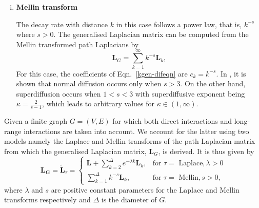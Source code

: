 \documentclass[10pt,a4paper]{article}
\theoremstyle{plain}
\theoremstyle{definition}
\begin{document}
\begin{enumerate}[1)]
\begin{enumerate}[i)]
    	    	\item \textbf{Mellin transform}
    	    	
    	    	The decay rate with distance $k$ in this case follows a power law, that is, $k^{-s}$ where $s>0$. 
    	    	The generalised Laplacian matrix can be computed from the Mellin transformed path Laplacians by
    	    	\begin{equation}
    	    	\mathbf{L}_{G} = \sum_{k=1}^{\infty} k^{-s} \mathbf{L}_k,
    	    	\label{mellin-transforms}
    	    	\end{equation}
    	    	 For this case, the coefficients of Eqn.~\ref{kgen-difeqn} are $c_{k} = k^{-s}$. 	
    	    	In \citep{estrada2017path}, it is shown that normal diffusion occurs only when $s > 3$. On the other hand, superdiffusion occurs when $1 <s < 3$ with superdiffusive exponent being $ \kappa = \frac{2}{s-1}$,
    	    	which leads to arbitrary values for $\kappa \in (1,\infty)$. 
    	    \end{enumerate}
        \end{enumerate}
        Given a finite graph $G=(V,E)$ for which both direct interactions and long-range interactions are taken into account. We account for the latter using two models namely the Laplace and Mellin transforms of the path Laplacian matrix from which the generalised Laplacian matrix, $\mathbf{L}_G$, is derived. It is thus given by
        \begin{equation}
        \mathbf{L_G} = \tilde{\mathbf{L}}_\tau = \begin{cases} 
        \mathbf{L} + \sum_{k=2}^{\Delta} e^{-\lambda k}  \mathbf{L}_k, & \mbox{for } \tau = \text{ Laplace},\lambda > 0 \\
        \sum_{k=1}^{\Delta} k^{-s} \mathbf{L}_k, &\mbox{for }  \tau = \text{ Mellin}, s>0,
        \end{cases} 
        \end{equation}
        where $\lambda$ and $s$ are positive constant parameters for the Laplace and Mellin transforms respectively and $\Delta$ is the diameter of $G$. 
        
\end{document}
